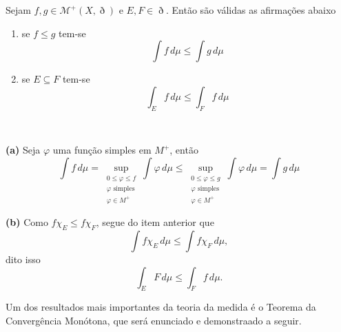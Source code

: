 \documentclass[a4paper, 11pt]{book}
\theoremstyle{definition}
\newcommand{\cM}{\mathcal{M}}
\begin{document}
\begin{lbox} \label{lm:propiedades-integral-nao-negativa}
    Sejam $f, g \in \cM^+(X,\eth)$ e $E, F \in \eth$.
    Então são válidas as afirmações abaixo
    \begin{enumerate}[leftmargin=*, label=\textbf{(\alph*)}]
        \item se $f \leqslant g$ tem-se
        \[
            \int f \, d\mu \leqslant \int g \, d\mu
        \]
        \item se $E \subseteq F$ tem-se
        \[
            \int_E f \, d\mu \leqslant \int_F f \, d\mu
        \]
    \end{enumerate}
\end{lbox}
\begin{prf}
    ~

    \textbf{(a)} Seja $\varphi$ uma função simples em $M^+$, então
    \[
        \int f \, d\mu = \sup_{\substack{0 \leqslant \varphi \leqslant f \\ \varphi \text{ simples} \\ \varphi \in M^+}} \int \varphi \, d \mu \leqslant \sup_{\substack{0 \leqslant \varphi \leqslant g \\ \varphi \text{ simples} \\ \varphi \in M^+}} \int \varphi \, d \mu = \int g \, d\mu
    \]

    \textbf{(b)} Como $f \chi_E \leqslant f \chi_F$, segue do item anterior que
    \[
        \int f \chi_E \, d\mu \leqslant \int f \chi_F \, d\mu,
    \]
    dito isso
    \[
        \int_E F \, d \mu \leqslant \int_F f \, d\mu.
    \]
\end{prf}

Um dos resultados mais importantes da teoria da medida é o Teorema da Convergência Monótona, que será enunciado e demonstraado a seguir.
\end{document}
